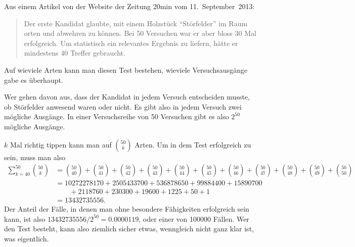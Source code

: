 Aus einem Artikel von der Website der Zeitung 20min vom 11.~September~2013:
\begin{quotation}
Der erste Kandidat glaubte, mit einem Holzstück ``Störfelder'' im Raum
orten und abwehren zu können.
Bei 50 Versuchen war er aber bloss 30 Mal erfolgreich. Um statistisch
ein relevantes Ergebnis zu liefern, hätte er mindestens 40 Treffer gebraucht.
\end{quotation}
Auf wieviele Arten kann man diesen Test bestehen, wieviele Versuchsausgänge
gabe es überhaupt.


\begin{loesung}
Wer gehen davon aus, dass der Kandidat in jedem Versuch entscheiden musste,
ob Störfelder anwesend waren oder nicht. Es gibt also in jedem Versuch
zwei mögliche Ausgänge. In einer Versuchsreihe von 50 Versuchen gibt
es also $2^{50}$ mögliche Ausgänge.

$k$ Mal richtig tippen kann man auf
$\binom{50}{k}$ Arten. Um in dem Test erfolgreich zu sein, muss man also
\begin{align*}
\sum_{k=40}^{50}\binom{50}{k}
&=
\binom{50}{40}
+
\binom{50}{41}
+
\binom{50}{42}
+
\binom{50}{43}
+
\binom{50}{44}
+
\binom{50}{45}
+
\binom{50}{46}
+
\binom{50}{47}
+
\binom{50}{48}
+
\binom{50}{49}
+
\binom{50}{50}
\\
&=
10272278170
+
2505433700
+
536878650
+
99884400
+
15890700
\\
&\qquad+
2118760
+
230300
+
19600
+
1225
+
50
+
1
\\
&=13432735556.
\end{align*}
Der Anteil der Fälle, in denen man ohne besondere Fähigkeiten 
erfolgreich sein kann, ist also $13432735556/2^{50}=0.0000119$,
oder einer von 100000 Fällen. Wer den Test besteht, kann also ziemlich
sicher etwas, wenngleich nicht ganz klar ist, was eigentlich.
\end{loesung}
